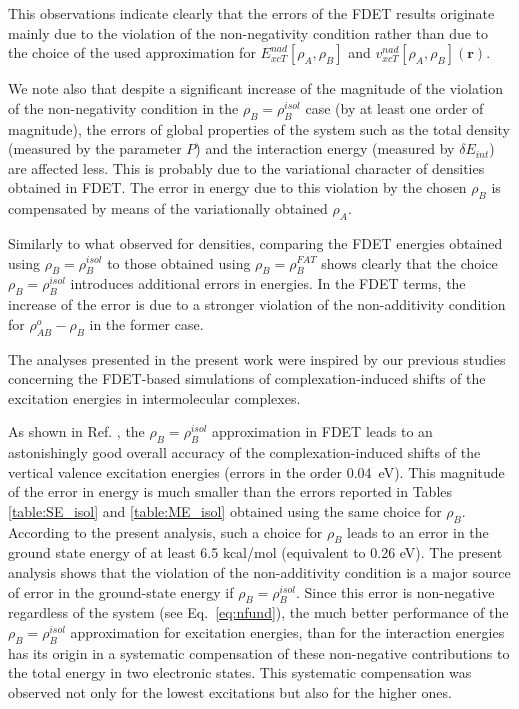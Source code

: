\documentclass[amsmath,amssymb,preprint,aip,jcp]{revtex4-1}
\begin{document}
This observations indicate clearly that the errors of the FDET results originate mainly due to the violation of the non-negativity condition rather than due to the choice of the used approximation for ${E}_{xcT}^{nad}[\rho_A,\rho_B]$ and ${v}_{xcT}^{nad}[\rho_A,\rho_B](\mathbf{r})$.

We note also that despite a significant increase of the magnitude of the violation of the non-negativity condition in the $\rho_B=\rho_B^{isol}$ case (by at least one order of magnitude), the errors of global properties of the system such as the total density (measured by the parameter $P$) and the interaction energy (measured by $\delta E_{int}$) are affected less. This is probably due to the variational character of densities obtained in FDET. The error in energy due to this violation by the chosen $\rho_B$ is compensated by means of the variationally obtained $\rho_A$.

Similarly to what observed for densities, comparing the FDET energies obtained using $\rho_B=\rho_B^{isol}$ to those obtained using $\rho_B=\rho_B^{FAT}$ shows clearly that the choice $\rho_B=\rho_B^{isol}$ introduces additional errors in energies. In the FDET terms, the increase of the error is due to a stronger violation of the non-additivity condition for $\rho^{o}_{AB}-\rho_B$ in the former case.

The analyses presented in the present work were inspired by our previous studies concerning the FDET-based simulations of complexation-induced shifts of the excitation energies in intermolecular complexes.

As shown in Ref. , the $\rho_B=\rho_B^{isol}$ approximation in FDET leads to an astonishingly good overall accuracy of the complexation-induced shifts of the vertical valence excitation energies (errors in the order 0.04~eV). 
This magnitude of the error in energy is much smaller than the errors reported in Tables \ref{table:SE_isol} and \ref{table:ME_isol} obtained using the same choice for $\rho_B$. 
According to the present analysis, such a choice for 
$\rho_B$ leads to an error in the ground state energy of at least 6.5 kcal/mol (equivalent to 0.26 eV).
The present analysis shows that the violation of the non-additivity condition is a major source of error in the ground-state energy if $\rho_B=\rho_B^{isol}$. Since this error is non-negative regardless of the system (see Eq.~\ref{eq:nfund}),
the much better performance of the $\rho_B=\rho_B^{isol}$ approximation for excitation energies\cite{Ricardi2018}, than for the interaction energies has its origin in a systematic compensation of these non-negative contributions to the total energy in two electronic states. This systematic compensation was observed not only for the lowest excitations but also for the higher ones. 
\end{document}
